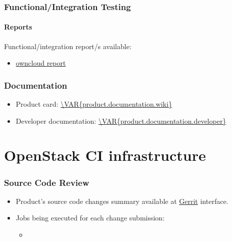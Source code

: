 \documentclass[a4wide,11pt]{article}
\begin{document}
\section{Functional/Integration Testing}
\label{sec:func_int_test}
\subsection{Reports}
Functional/integration report/s available:
\begin{itemize}
    \item \href{\VAR{r}}{owncloud report}
\end{itemize}


\section{Documentation}
\label{sec:documentation}
\begin{itemize}
    \item Product card: \url{\VAR{product.documentation.wiki}}
    \item Developer documentation: \url{\VAR{product.documentation.developer}}
\end{itemize}



\part{OpenStack CI infrastructure}

\section{Source Code Review}
\begin{itemize}
    \item Product's source code changes summary available at \href{\VAR{product.gerrit.url}}{Gerrit} interface. \\
    \item Jobs being executed for each change submission:
    \begin{itemize}
            \item \texttt{}
    \end{itemize}
\end{itemize}
\end{document}
